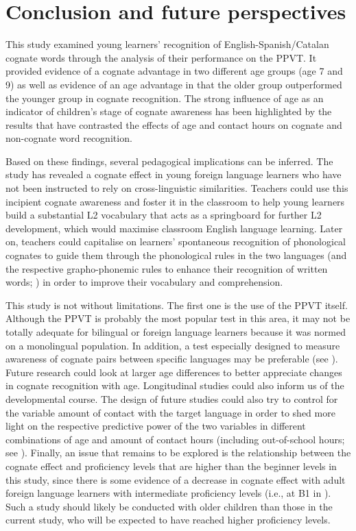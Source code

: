\documentclass[output=paper,modfonts,nonflat,newtxmath]{langsci/langscibook}
\begin{document}
\section{{Conclusion} \textbf{and} \textbf{future} \textbf{perspectives}}

This study examined young learners’ recognition of English-Spanish/Catalan cognate words through the analysis of their performance on the PPVT. It provided evidence of a cognate advantage in two different age groups (age 7 and 9) as well as evidence of an age advantage in that the older group outperformed the younger group in cognate recognition. The strong influence of age as an indicator of children’s stage of cognate awareness has been highlighted by the results that have contrasted the effects of age and contact hours on cognate and non-cognate word recognition.

 {Based on these findings, several pedagogical implications can be inferred. The study has revealed a cognate effect in young foreign language learners who have not been instructed to rely on cross-linguistic similarities. Teachers could use this incipient cognate awareness and foster it in the classroom to help young learners build a substantial L2 vocabulary that acts as a springboard for further L2 development, which would maximise classroom English language learning. Later on, teachers could capitalise on learners’ spontaneous recognition of phonological cognates to guide them through the phonological rules in the two languages (and the respective grapho-phonemic rules to enhance their recognition of written words; \citealt{LázaroIbarrola2010}) in order to improve their vocabulary and comprehension.}

 {This study is not without limitations. The first one is the use of the PPVT itself. Although the PPVT is probably the most popular test in this area, it may not be totally adequate for bilingual or foreign language learners because it was normed on a monolingual population. In addition, a test especially designed to measure awareness of cognate pairs between specific languages may be preferable (see \citealt{GoriotEtAl2018,LesniewskaEtAl2018}). Future research could look at larger age differences to better appreciate changes in cognate recognition with age. Longitudinal studies could also inform us of the developmental course. The design of future studies could also try to control for the variable amount of contact with the target language in order to shed more light on the respective predictive power of the two variables in different combinations of age and amount of contact hours (including out-of-school hours; see \citealt{MuñozEtAl2018}).  Finally, an issue that remains to be explored is the relationship between the cognate effect and proficiency levels that are higher than the beginner levels in this study, since there is some evidence of a decrease in cognate effect with adult foreign language learners with intermediate proficiency levels (i.e., at B1 in \citealt{CasaponsaEtAl2015}). Such a study should likely be conducted with older children than those in the current study, who will be expected to have reached higher proficiency levels.}
\end{document}
